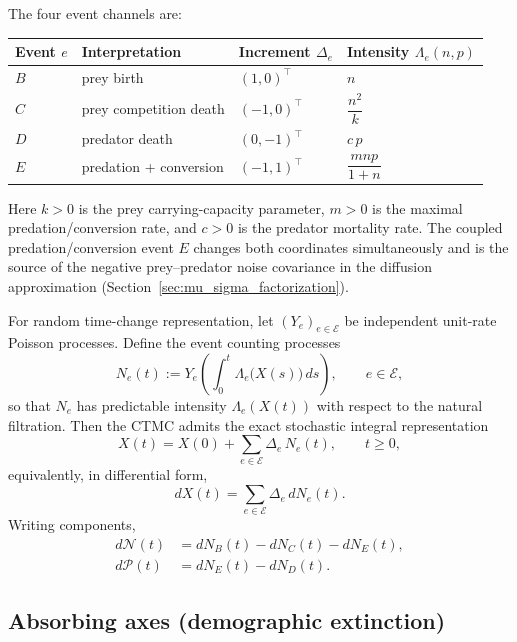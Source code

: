 \documentclass[pdflatex,sn-mathphys-ay]{sn-jnl}
\theoremstyle{thmstyleone}
\theoremstyle{definition}
\theoremstyle{remark}
\begin{document}
The four event channels are:
\begin{center}
\begin{tabular}{llll}
\hline
Event $e$ & Interpretation & Increment $\Delta_e$ & Intensity $\Lambda_e(n,p)$\\
\hline
$B$ & prey birth & $(1,0)^\top$ & $n$\\
$C$ & prey competition death & $(-1,0)^\top$ & $\dfrac{n^2}{k}$\\[1ex]
$D$ & predator death & $(0,-1)^\top$ & $c\,p$\\
$E$ & predation + conversion & $(-1,1)^\top$ & $\dfrac{mnp}{1+n}$\\[1ex]
\hline
\end{tabular}
\end{center}
Here $k>0$ is the prey carrying-capacity parameter, $m>0$ is the maximal predation/conversion rate, and $c>0$ is the
predator mortality rate. The coupled predation/conversion event $E$ changes both coordinates simultaneously and is the
source of the negative prey--predator noise covariance in the diffusion approximation
(Section~\ref{sec:mu_sigma_factorization}).

For random time-change representation, let $(Y_e)_{e\in\mathcal E}$ be independent unit-rate Poisson processes. Define the event counting processes
\[
N_e(t):=Y_e\!\left(\int_0^t \Lambda_e\bigl(X(s)\bigr)\,ds\right),
\qquad e\in\mathcal E,
\]
so that $N_e$ has predictable intensity $\Lambda_e(X(t))$ with respect to the natural filtration. Then the CTMC admits
the exact stochastic integral representation
\begin{equation}\label{eq:ctmc_jump_representation_A}
X(t)=X(0)+\sum_{e\in\mathcal E}\Delta_e\,N_e(t),
\qquad t\ge 0,
\end{equation}
equivalently, in differential form,
\begin{equation}\label{eq:ctmc_differential_form_A}
dX(t)=\sum_{e\in\mathcal E}\Delta_e\,dN_e(t).
\end{equation}
Writing components,
\begin{equation}\label{eq:ctmc_components_A}
\begin{aligned}
d\mathcal N(t) &= dN_B(t)-dN_C(t)-dN_E(t),\\[4pt]
d\mathcal P(t) &= dN_E(t)-dN_D(t).
\end{aligned}
\end{equation}

\subsection{Absorbing axes (demographic extinction)}
\label{subsec:ctmc_absorbing_axes}
\end{document}
